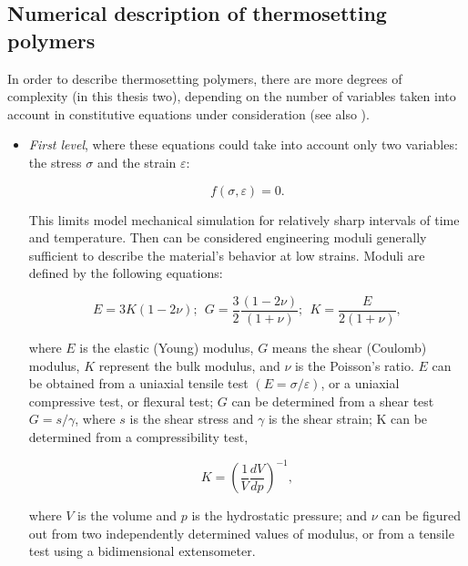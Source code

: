 \subsection{Numerical description of thermosetting polymers}\label{sec:poly_complexity}
In order to describe thermosetting polymers, there are more degrees of complexity (in this thesis two), depending on the number of variables taken into account in constitutive equations under consideration (see also \cite{thermosetting_polymers}). 
\begin{itemize}
	
	\item 
	\textit{First level}, where these equations could take into account only two variables: the stress $\sigma$ and the strain $\varepsilon$:
	
	\begin{equation}\label{eq2:first_level}
		f(\sigma,\varepsilon)=0.
	\end{equation}
	
	This limits model mechanical simulation for relatively sharp intervals of time and temperature. Then can be considered engineering moduli generally sufficient to describe the material's behavior at low strains. Moduli are defined by the following equations:
	
	\begin{equation}\label{eq:basic_moduli}
		E = 3K(1-2\nu); ~~G=\dfrac{3}{2}\dfrac{(1-2\nu)}{(1+\nu)};~~ K=\frac{E}{2(1+\nu)},
	\end{equation}
	
	where $E$ is the elastic (Young) modulus, $G$ means the shear (Coulomb) modulus, $K$ represent the bulk modulus, and $\nu$ is the Poisson's ratio. $E$ can be obtained from a uniaxial tensile test $(E=\sigma/\varepsilon)$, or a uniaxial compressive test, or flexural test; $G$ can be determined from a shear test $G=s/\gamma$, where $s$ is the shear stress and $\gamma$ is the shear strain; K can be determined from a compressibility test, 
	
	\begin{equation}\label{eq:K_moduli}
		K=\left(\dfrac{1}{V}\dfrac{dV}{dp}\right)^{-1},
	\end{equation}
	
	where $V$ is the volume and $p$ is the hydrostatic pressure; and $\nu$ can be figured out from two independently determined values of modulus, or from a tensile test using a bidimensional extensometer. 
	

\end{itemize}
